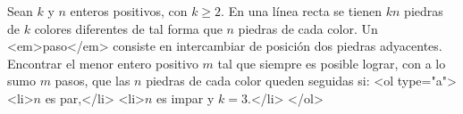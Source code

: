 Sean $k$ y $n$ enteros positivos, con $k \geq 2$. En una línea recta se tienen $kn$ piedras de $k$ colores diferentes de tal forma que $n$ piedras de cada color. Un <em>paso</em> consiste en intercambiar de posición dos piedras adyacentes. Encontrar el menor entero positivo $m$ tal que siempre es posible lograr, con a lo sumo $m$ pasos, que las $n$ piedras de cada color queden seguidas si:
<ol type="a">
  <li>$n$ es par,</li>
  <li>$n$ es impar y $k=3$.</li>
</ol>
